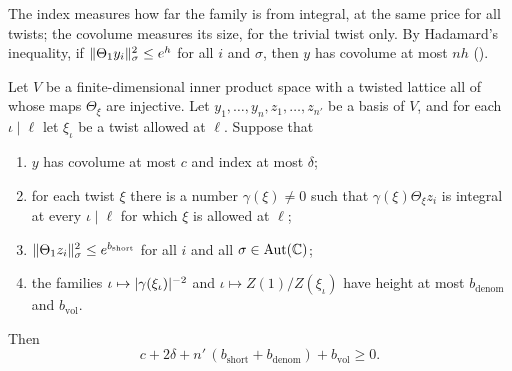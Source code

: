 The index measures how far the family is from integral, at the same price for all twists; the
covolume measures its size, for the trivial twist only. By Hadamard's inequality,
if $\lVert\Theta_1 y_i\rVert_\sigma^2 \le e^h$ for all $i$ and $\sigma$, then $y$ has covolume at most
$nh$ ().

\begin{theorem}
\label{setup:thm:twist}
Let $V$ be a finite-dimensional inner product space with a twisted lattice all of whose maps
$\Theta_\xi$ are injective. Let $y_1, \dots, y_n, z_1, \dots, z_{n'}$ be a basis of $V$, and for
each $\iota \mid \ell$ let $\xi_\iota$ be a twist allowed at $\ell$. Suppose that
\begin{enumerate}[label=(\roman*)]
\item $y$ has covolume at most $c$ and index at most $\delta$;
\item for each twist $\xi$ there is a number $\gamma(\xi) \ne 0$ such that
  $\gamma(\xi)\Theta_\xi z_i$ is integral at every $\iota \mid \ell$ for which $\xi$ is allowed at
  $\ell$;
\item $\lVert\Theta_1 z_i\rVert_\sigma^2 \le e^{b_{\mathrm{short}}}$ for all $i$ and all
  $\sigma \in \operatorname{Aut}(\mathbb{C})$;
\item the families $\iota \mapsto \lvert\gamma(\xi_\iota)\rvert^{-2}$ and
  $\iota \mapsto Z(1)/Z(\xi_\iota)$ have height at most $b_{\mathrm{denom}}$ and
  $b_{\mathrm{vol}}$.
\end{enumerate}
Then
\[
  c + 2\delta + n'\,(b_{\mathrm{short}} + b_{\mathrm{denom}}) + b_{\mathrm{vol}} \ge 0 .
\]
\end{theorem}

